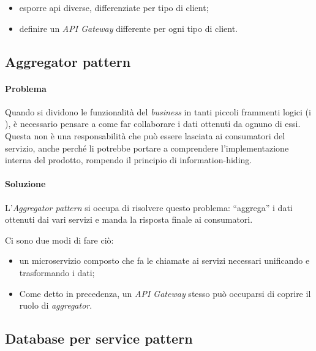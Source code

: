 \begin{itemize}
	\item esporre \gls{api} diverse, differenziate per tipo di client;
	\item definire un \textit{API Gateway} differente per ogni tipo di client.
\end{itemize}


\subsection{Aggregator pattern}

\paragraph*{Problema} Quando si dividono le funzionalità del \textit{business} in tanti piccoli frammenti logici (i ), è necessario pensare
a come far collaborare i dati ottenuti da ognuno di essi.
Questa non è una responsabilità che può essere lasciata ai consumatori del servizio, anche perché li potrebbe portare a comprendere l'implementazione interna del prodotto, rompendo il principio di \gls{information-hiding}\gloss.

\paragraph*{Soluzione} L'\textit{Aggregator pattern} si occupa di risolvere questo problema: ``aggrega'' i dati ottenuti dai vari servizi e
manda la risposta finale ai consumatori.

Ci sono due modi di fare ciò:
\begin{itemize}
	\item un \gls{microservizio} composto che fa le chiamate ai servizi necessari
	unificando e trasformando i dati;
	\item Come detto in precedenza, un \textit{API Gateway} stesso può occuparsi di coprire il ruolo di \textit{aggregator}.
\end{itemize}


\subsection{Database per service pattern}

